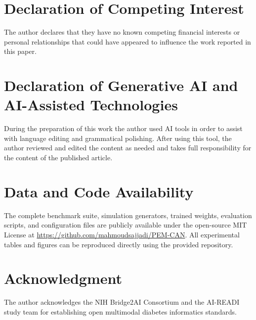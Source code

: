 \documentclass[a4paper,fleqn]{cas-dc}
\begin{document}
\section*{Declaration of Competing Interest}
The author declares that they have no known competing financial interests or personal relationships that could have appeared to influence the work reported in this paper.

\section*{Declaration of Generative AI and AI-Assisted Technologies}
During the preparation of this work the author used AI tools in order to assist with language editing and grammatical polishing. After using this tool, the author reviewed and edited the content as needed and takes full responsibility for the content of the published article.

\section*{Data and Code Availability}
The complete benchmark suite, simulation generators, trained weights, evaluation scripts, and configuration files are publicly available under the open-source MIT License at \url{https://github.com/mahmoudsajjadi/PEM-CAN}. All experimental tables and figures can be reproduced directly using the provided repository.

\section*{Acknowledgment}
The author acknowledges the NIH Bridge2AI Consortium and the AI-READI study team for establishing open multimodal diabetes informatics standards.

\printcredits
\end{document}
